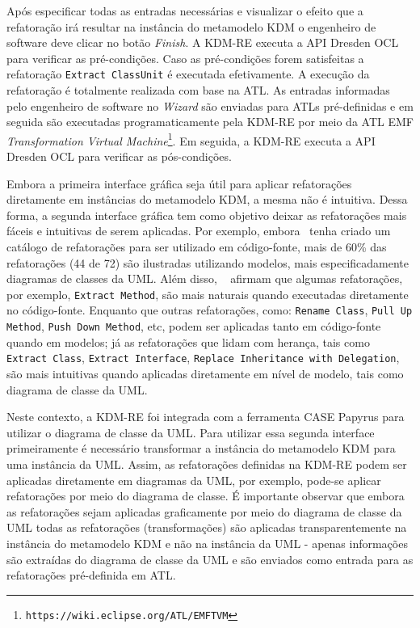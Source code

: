 Após especificar todas as entradas necessárias e visualizar o efeito que a refatoração irá resultar na instância do metamodelo KDM o engenheiro de software deve clicar no botão \textit{Finish}. A KDM-RE executa a API Dresden OCL para verificar as pré-condições. Caso as pré-condições forem satisfeitas a refatoração \texttt{Extract ClassUnit} é executada efetivamente. A execução da refatoração é totalmente realizada com base na ATL. As entradas informadas pelo engenheiro de software no \textit{Wizard} são enviadas para ATLs pré-definidas e em seguida são executadas programaticamente pela KDM-RE por meio da ATL EMF \textit{Transformation Virtual Machine}\footnote{\texttt{https://wiki.eclipse.org/ATL/EMFTVM}}. Em seguida, a KDM-RE  executa a API Dresden OCL para verificar as pós-condições. 


Embora a primeira interface gráfica seja útil para aplicar refatorações diretamente em instâncias do metamodelo KDM, a mesma não é intuitiva. Dessa forma, a segunda interface gráfica tem como objetivo deixar as refatorações mais fáceis e intuitivas de serem aplicadas. Por exemplo, embora~ tenha criado um catálogo de refatorações para ser utilizado em código-fonte, mais de 60\% das refatorações (44 de 72) são ilustradas utilizando modelos, mais especificadamente diagramas de classes da UML. Além disso, ~ afirmam que algumas refatorações, por exemplo, \texttt{Extract Method}, são mais naturais quando executadas diretamente no código-fonte. Enquanto que outras refatorações, como: \texttt{Rename Class}, \texttt{Pull Up Method}, \texttt{Push Down Method}, etc, podem ser aplicadas tanto em código-fonte quando em modelos; já as refatorações que lidam com herança, tais como \texttt{Extract Class}, \texttt{Extract Interface}, \texttt{Replace Inheritance with Delegation}, são mais intuitivas quando aplicadas diretamente em nível de modelo, tais como diagrama de classe da UML. 

Neste contexto, a KDM-RE foi integrada com a ferramenta CASE Papyrus para utilizar o diagrama de classe da UML. Para utilizar essa segunda interface primeiramente é necessário transformar a instância do metamodelo KDM para uma instância da UML. Assim, as refatorações definidas na KDM-RE podem ser aplicadas diretamente em diagramas da UML, por exemplo, pode-se aplicar refatorações por meio do diagrama de classe. É importante observar que embora as refatorações sejam aplicadas graficamente por meio do diagrama de classe da UML todas as refatorações (transformações) são aplicadas transparentemente na instância do metamodelo KDM e não na instância da UML - apenas informações são extraídas do diagrama de classe da UML e são enviados como entrada para as refatorações pré-definida em ATL. %


